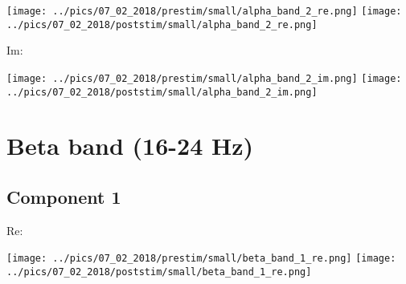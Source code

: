 \documentclass{article}
\begin{document}
\hspace{2cm}
\texttt{[image: ../pics/07\_02\_2018/prestim/small/alpha\_band\_2\_re.png]}
\hspace{2cm}
\texttt{[image: ../pics/07\_02\_2018/poststim/small/alpha\_band\_2\_re.png]}

Im:

\hspace{2cm}
\texttt{[image: ../pics/07\_02\_2018/prestim/small/alpha\_band\_2\_im.png]}
\hspace{2cm}
\texttt{[image: ../pics/07\_02\_2018/poststim/small/alpha\_band\_2\_im.png]}



\section{Beta band (16-24 Hz)}

\subsection*{Component 1}
Re:

\hspace{2cm}
\texttt{[image: ../pics/07\_02\_2018/prestim/small/beta\_band\_1\_re.png]}
\hspace{2cm}
\texttt{[image: ../pics/07\_02\_2018/poststim/small/beta\_band\_1\_re.png]}
\end{document}
